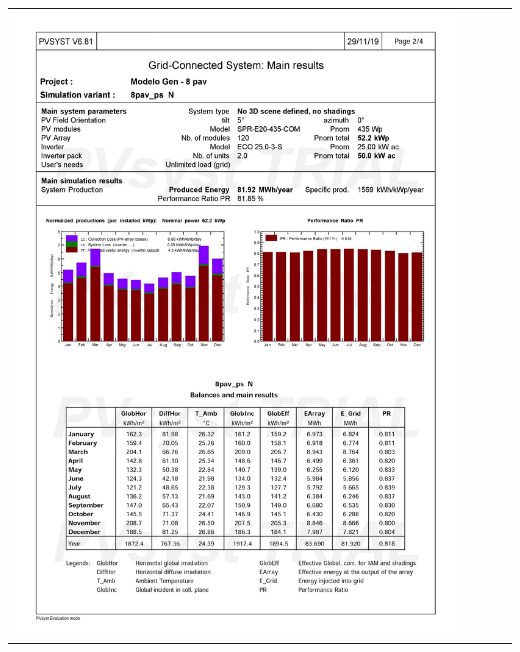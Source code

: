 \begin{table}[H]
    \centering
    \begin{tabular}{l}
        \includegraphics[width=0.9\textwidth]{figures/attachments/resultpv18.jpg}
    \end{tabular}
\end{table}
\pagebreak
